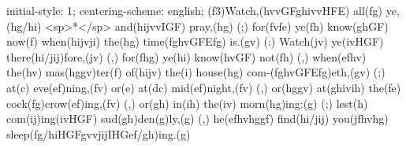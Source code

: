 initial-style: 1;
centering-scheme: english;
(f3)Watch,(hvvGFghivvHFE) all(fg) ye,(hg/hi) <sp>*</sp> and(hijvvIGF) pray,(hg) (;) for(fvfe) ye(fh) know(ghGF) now(f) when(hijvji) the(hg) time(fghvGFEfg) is.(gv) (:) Watch(jv) ye(ivHGF) there(hi/jij)fore,(jv) (,) for(fhg) ye(hi) know(hvGF) not(fh) (,) when(efhv) the(hv) mas(hggv)ter(f) of(hijv) the(i) house(hg) com-(fghvGFEfg)eth,(gv) (;) at(c) eve(ef)ning,(fv) or(e) at(dc) mid(ef)night,(fv) (,) or(hggv) at(ghivih) the(fe) cock(fg)crow(ef)ing,(fv) (,) or(gh) in(ih) the(iv) morn(hg)ing:(g) (;) lest(h) com(ij)ing(ivHGF) sud(gh)den(g)ly,(g) (,) he(efhvhggf) find(hi/jij) you(jfhvhg) sleep(fg/hiHGFgvvjijIHGef/gh)ing.(g)
